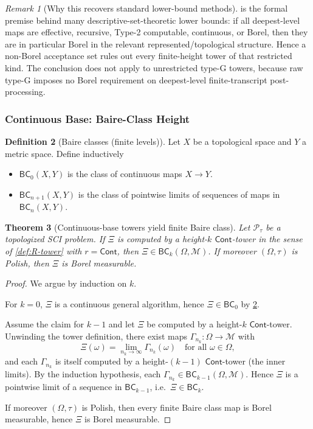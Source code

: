 \documentclass{lmcs} %
\theoremstyle{plain}
\theoremstyle{plain}
\newtheorem{theorem}{Theorem}[section]
\theoremstyle{definition}
\newtheorem{definition}[theorem]{Definition}
\theoremstyle{remark}
\newtheorem{remark}[theorem]{Remark}
\theoremstyle{definition}
\theoremstyle{remark}
\numberwithin{equation}{section}
\newcommand{\Cont}{\mathsf{Cont}}
\begin{document}
\begin{remark}[Why this recovers standard lower-bound methods]
 is the formal premise behind many
descriptive-set-theoretic lower bounds: if all deepest-level maps are effective, recursive,
Type-2 computable, continuous, or Borel, then they are in particular Borel in the
relevant represented/topological structure. Hence a non-Borel acceptance set rules
out every finite-height tower of that restricted kind. The conclusion does not apply
to unrestricted type-G towers, because raw type-G imposes no Borel requirement on deepest-level finite-transcript post-processing.
\end{remark}

\subsubsection{Continuous Base: Baire-Class Height}

\begin{definition}[Baire classes (finite levels)]\label{def:baire-classes}
Let $X$ be a topological space and $Y$ a metric space.
Define inductively
\begin{itemize}
\item $\mathsf{BC}_0(X,Y)$ is the class of continuous maps $X\to Y$.
\item $\mathsf{BC}_{n+1}(X,Y)$ is the class of pointwise limits of sequences of maps in $\mathsf{BC}_n(X,Y)$.
\end{itemize}
\end{definition}

\begin{theorem}[Continuous-base towers yield finite Baire class]\label{thm:cont-tower-baireclass}
Let $\mathcal{P}_\tau$ be a topologized SCI problem.
If $\Xi$ is computed by a height-$k$ $\Cont$-tower in the sense of \cref{def:R-tower} with $r=\Cont$,
then $\Xi\in \mathsf{BC}_k(\Omega,\mathcal{M})$. If moreover $(\Omega,\tau)$ is Polish, then $\Xi$ is Borel measurable.
\end{theorem}

\begin{proof}
We argue by induction on $k$.

For $k=0$, $\Xi$ is a continuous general algorithm, hence $\Xi\in\mathsf{BC}_0$ by \cref{def:baire-classes}.

Assume the claim for $k-1$ and let $\Xi$ be computed by a height-$k$ $\Cont$-tower.
Unwinding the tower definition, there exist maps $\Gamma_{n_k}:\Omega\to\mathcal{M}$ with
\[
\Xi(\omega)=\lim_{n_k\to\infty}\Gamma_{n_k}(\omega)
\quad\text{for all }\omega\in\Omega,
\]
and each $\Gamma_{n_k}$ is itself computed by a height-$(k-1)$ $\Cont$-tower (the inner limits).
By the induction hypothesis, each $\Gamma_{n_k}\in \mathsf{BC}_{k-1}(\Omega,\mathcal{M})$.
Hence $\Xi$ is a pointwise limit of a sequence in $\mathsf{BC}_{k-1}$, i.e.\ $\Xi\in \mathsf{BC}_k$.

If moreover $(\Omega,\tau)$ is Polish, then every finite Baire class map is Borel measurable,
hence $\Xi$ is Borel measurable.
\end{proof}
\end{document}
